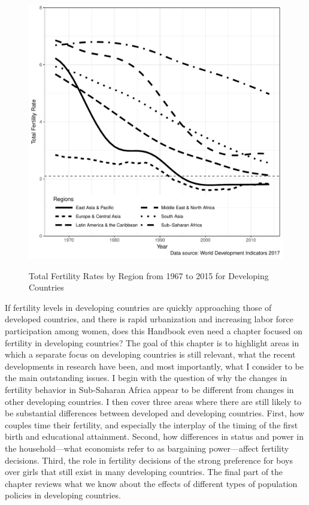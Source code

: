 \documentclass[letterpaper,12pt]{article}
\begin{document}
\begin{figure}[hp]
    \centering
    \caption{Total Fertility Rates by Region from 1967 to 2015 for Developing Countries}
    \includegraphics[width=0.95\linewidth]{../figures/totalFertilityRatesBW.pdf}
    \label{fig:TFR}
\end{figure}

If fertility levels in developing countries are quickly approaching
those of developed countries, and there is rapid urbanization and
increasing labor force participation among women, does this Handbook
even need a chapter focused on fertility in developing countries? 
The goal of this chapter is to highlight areas in which a separate focus
on developing countries is still relevant, what the recent developments
in research have been, and most importantly, what I consider to be the
main outstanding issues. 
I begin with the question of why the changes in fertility behavior in
Sub-Saharan Africa appear to be different from changes in other
developing countries. 
I then cover three areas where there are still likely to be substantial
differences between developed and developing countries. 
First, how couples time their fertility, and especially the interplay of
the timing of the first birth and educational attainment. 
Second, how differences in status and power in the household---what
economists refer to as bargaining power---affect fertility decisions. 
Third, the role in fertility decisions of the strong preference for boys
over girls that still exist in many developing countries. 
The final part of the chapter reviews what we know about the effects of
different types of population policies in developing countries.
\end{document}

